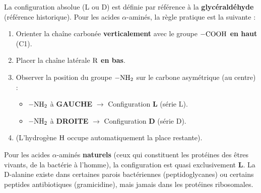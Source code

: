\documentclass[11pt]{article}
\begin{document}
La configuration absolue (L ou D) est définie par référence à la \textbf{glycéraldéhyde} (référence historique). Pour les acides $\alpha$-aminés, la règle pratique est la suivante :

\begin{methode}
\begin{enumerate}
    \item Orienter la chaîne carbonée \textbf{verticalement} avec le groupe \textbf{$\ce{-COOH}$ en haut} (C1).
    \item Placer la chaîne latérale $\ce{R}$ \textbf{en bas}.
    \item Observer la position du groupe \textbf{$\ce{-NH2}$} sur le carbone asymétrique (au centre) :
    \begin{itemize}
        \item $\ce{-NH2}$ à \textbf{GAUCHE} $\rightarrow$ Configuration \textbf{L} (série L).
        \item $\ce{-NH2}$ à \textbf{DROITE} $\rightarrow$ Configuration \textbf{D} (série D).
    \end{itemize}
    \item (L'hydrogène $\ce{H}$ occupe automatiquement la place restante).
\end{enumerate}
\end{methode}

\begin{aretenir}[Règle mnémotechnique : « COOH en haut, R en bas, NH2 à gauche = L »]
Pour les acides $\alpha$-aminés \textbf{naturels} (ceux qui constituent les protéines des êtres vivants, de la bactérie à l'homme), la configuration est quasi exclusivement \textbf{L}. La D-alanine existe dans certaines parois bactériennes (peptidoglycanes) ou certains peptides antibiotiques (gramicidine), mais jamais dans les protéines ribosomales.
\end{aretenir}
\end{document}
